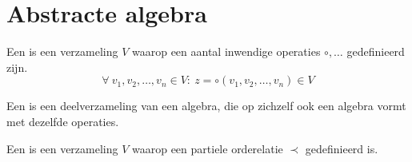 \documentclass[main.tex]{subfiles}
\begin{document}
\section{Abstracte algebra}
\label{sec:abstracte-algebra}

\begin{de}
  Een  is een verzameling $V$ waarop een aantal inwendige operaties $\circ,\ldots$ gedefinieerd zijn.
  \[ \forall\ v_1,v_2,\ldots,v_n \in V:\ z = \circ(v_1,v_2,\ldots,v_n) \in V \]
\end{de}

\begin{de}
  Een  is een deelverzameling van een algebra, die op zichzelf ook een algebra vormt met dezelfde operaties.
\end{de}

\begin{de}
  Een  is een verzameling $V$ waarop een partiele orderelatie $\prec$ gedefinieerd is.
\end{de}
\end{document}
